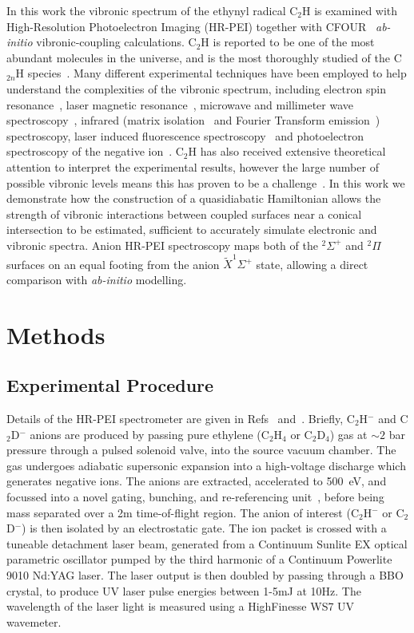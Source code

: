 \documentclass[aip,graphicx]{revtex4-1}
\begin{document}
In this work the vibronic spectrum of the ethynyl radical C$_2$H is examined with High-Resolution Photoelectron Imaging (HR-PEI) together with CFOUR~\cite{dev20}  \emph{ab-initio} vibronic-coupling calculations. C$_2$H is reported to be one of the most abundant molecules in the universe, and is the most thoroughly studied of the C$_{2n}$H species~\cite{wil91,hei99,for10}. Many different experimental techniques have been employed to help understand the complexities of the vibronic spectrum, including electron spin resonance~\cite{coc64,jin85}, laser magnetic resonance~\cite{bro88,pfe96,sch98}, microwave and millimeter wave spectroscopy~\cite{sas81,got83,end89,mul00}, infrared (matrix isolation~\cite{she87,jac87,for95} and Fourier Transform emission~\cite{ver88}) spectroscopy, laser induced fluorescence spectroscopy~\cite{hsu93,hsu95,chi99} and photoelectron spectroscopy of the negative ion~\cite{erv91,tay98,zho07}. C$_2$H has also received extensive theoretical attention to interpret the experimental results, however the large number of possible vibronic levels means this has proven to be a challenge~\cite{per90,per91,per91b,per91c,per92,car00,tar03,tar04,for10,sta21,gul21}. In this work we demonstrate how the construction of a quasidiabatic Hamiltonian allows the strength of vibronic interactions between coupled surfaces near a conical intersection to be estimated, sufficient to accurately simulate electronic and vibronic spectra. Anion HR-PEI spectroscopy maps both of the $^2\Sigma^+$ and $^2\Pi$ surfaces on an equal footing from the anion $\tilde{X}^1\Sigma^+$ state, allowing a direct comparison with \emph{ab-initio} modelling. 

\section{Methods}
\subsection{Experimental Procedure}
Details of the HR-PEI spectrometer are given in Refs~ and~. Briefly, C$_2$H$^-$ and C$_2$D$^-$ anions are produced by passing pure ethylene (C$_2$H$_4$ or C$_2$D$_4$) gas at $\sim2$ bar pressure through a pulsed solenoid valve, into the source vacuum chamber. The gas undergoes adiabatic supersonic expansion into a high-voltage discharge which generates negative ions. The anions are extracted, accelerated to 500~eV, and focussed into a novel gating, bunching, and re-referencing unit~\cite{ded01}, before being mass separated over a 2m time-of-flight region. The anion of interest (C$_2$H$^-$ or C$_2$D$^-$) is then isolated by an electrostatic gate. The ion packet is crossed with a tuneable detachment laser beam, generated from a Continuum Sunlite EX optical parametric oscillator pumped by the third harmonic of a Continuum Powerlite 9010 Nd:YAG laser. The laser output is then doubled by passing through a BBO crystal, to produce UV laser pulse energies between 1-5mJ at 10Hz. The wavelength of the laser light is measured using a HighFinesse WS7 UV wavemeter.
\end{document}
